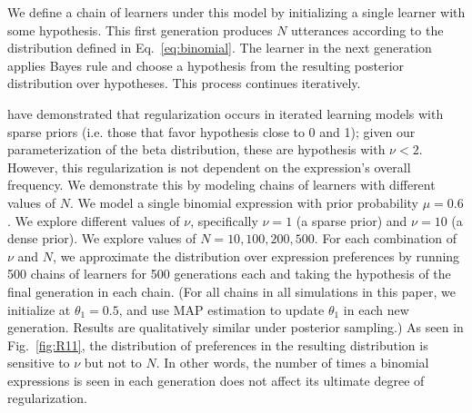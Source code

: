 \documentclass{evolang11}
\begin{document}

We define a chain of learners under this model by initializing a single learner with some hypothesis. This first generation produces $N$ utterances according to the distribution defined in Eq.\ \ref{eq:binomial}. The learner in the next generation applies Bayes rule and choose a hypothesis from the resulting posterior distribution over hypotheses. This process continues iteratively.

 have demonstrated that regularization occurs in iterated learning models with sparse priors (i.e. those that favor hypothesis close to 0 and 1); given our parameterization of the beta distribution, these are hypothesis with $\nu<2$. However, this regularization is not dependent on the expression's overall frequency. We demonstrate this by modeling chains of learners with different values of $N$. We model a single binomial expression with prior probability $\mu=0.6$. We explore different values of $\nu$, specifically $\nu=1$ (a sparse prior) and $\nu=10$ (a dense prior). We explore values of $N=10,100,200,500$. For each combination of $\nu$ and $N$, we approximate the distribution over expression preferences by running 500 chains of learners for 500 generations each and taking the hypothesis of the final generation in each chain. (For all chains in all simulations in this paper, we initialize at $\theta_1=0.5$, and use MAP estimation to update $\theta_1$ in each new generation. Results are qualitatively similar under posterior sampling.)  As seen in Fig.\ \ref{fig:R11}, the distribution of preferences in the resulting distribution is sensitive to $\nu$ but not to $N$. In other words, the number of times a binomial expressions is seen in each generation does not affect its ultimate degree of regularization.
\end{document}
